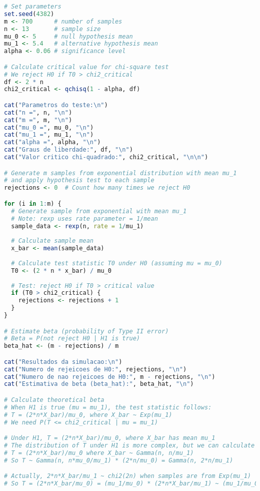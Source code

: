 \documentclass[11pt,a4paper]{article}
\begin{document}
\begin{lstlisting}[language=R]
# Set parameters
set.seed(4382)
m <- 700      # number of samples
n <- 13       # sample size
mu_0 <- 5     # null hypothesis mean
mu_1 <- 5.4   # alternative hypothesis mean
alpha <- 0.06 # significance level

# Calculate critical value for chi-square test
# We reject H0 if T0 > chi2_critical
df <- 2 * n
chi2_critical <- qchisq(1 - alpha, df)

cat("Parametros do teste:\n")
cat("n =", n, "\n")
cat("m =", m, "\n")
cat("mu_0 =", mu_0, "\n")
cat("mu_1 =", mu_1, "\n")
cat("alpha =", alpha, "\n")
cat("Graus de liberdade:", df, "\n")
cat("Valor critico chi-quadrado:", chi2_critical, "\n\n")

# Generate m samples from exponential distribution with mean mu_1
# and apply hypothesis test to each sample
rejections <- 0  # Count how many times we reject H0

for (i in 1:m) {
  # Generate sample from exponential with mean mu_1
  # Note: rexp uses rate parameter = 1/mean
  sample_data <- rexp(n, rate = 1/mu_1)
  
  # Calculate sample mean
  x_bar <- mean(sample_data)
  
  # Calculate test statistic T0 under H0 (assuming mu = mu_0)
  T0 <- (2 * n * x_bar) / mu_0
  
  # Test: reject H0 if T0 > critical value
  if (T0 > chi2_critical) {
    rejections <- rejections + 1
  }
}

# Estimate beta (probability of Type II error)
# Beta = P(not reject H0 | H1 is true)
beta_hat <- (m - rejections) / m

cat("Resultados da simulacao:\n")
cat("Numero de rejeicoes de H0:", rejections, "\n")
cat("Numero de nao rejeicoes de H0:", m - rejections, "\n")
cat("Estimativa de beta (beta_hat):", beta_hat, "\n")

# Calculate theoretical beta
# When H1 is true (mu = mu_1), the test statistic follows:
# T = (2*n*X_bar)/mu_0, where X_bar ~ Exp(mu_1)
# We need P(T <= chi2_critical | mu = mu_1)

# Under H1, T = (2*n*X_bar)/mu_0, where X_bar has mean mu_1
# The distribution of T under H1 is more complex, but we can calculate it
# T = (2*n*X_bar)/mu_0 where X_bar ~ Gamma(n, n/mu_1)
# So T ~ Gamma(n, n*mu_0/mu_1) * (2*n/mu_0) = Gamma(n, 2*n/mu_1)

# Actually, 2*n*X_bar/mu_1 ~ chi2(2n) when samples are from Exp(mu_1)
# So T = (2*n*X_bar/mu_0) = (mu_1/mu_0) * (2*n*X_bar/mu_1) ~ (mu_1/mu_0) * chi2(2n)


\end{lstlisting}
\end{document}
